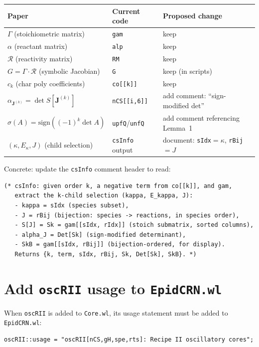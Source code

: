 \documentclass[11pt]{article}
\begin{document}
\begin{center}
\begin{tabular}{lll}
\textbf{Paper} & \textbf{Current code} & \textbf{Proposed change} \\
\hline
$\Gamma$ (stoichiometric matrix) & \texttt{gam} & keep \\
$\alpha$ (reactant matrix) & \texttt{alp} & keep \\
$\mathcal{R}$ (reactivity matrix) & \texttt{RM} & keep \\
$G = \Gamma \cdot \mathcal{R}$ (symbolic Jacobian) & \texttt{G} & keep (in scripts) \\
$c_k$ (char poly coefficients) & \texttt{co[[k]]} & keep \\
$\alpha_{\mathbf{J}^{(k)}} = \det S[\mathbf{J}^{(k)}]$ & \texttt{nCS[[i,6]]} & add comment: ``sign-modified det'' \\
$\sigma(A) = \mathrm{sign}((-1)^k \det A)$ & \texttt{upfQ}/\texttt{unfQ} & add comment referencing Lemma~1 \\
$(\kappa, E_\kappa, J)$ (child selection) & \texttt{csInfo} output & document: \texttt{sIdx}$=\kappa$, \texttt{rBij}$=J$ \\
\end{tabular}
\end{center}

Concrete: update the \texttt{csInfo} comment header to read:
\begin{verbatim}
(* csInfo: given order k, a negative term from co[[k]], and gam,
   extract the k-child selection (kappa, E_kappa, J):
   - kappa = sIdx (species subset),
   - J = rBij (bijection: species -> reactions, in species order),
   - S[J] = Sk = gam[[sIdx, rIdx]] (stoich submatrix, sorted columns),
   - alpha_J = Det[Sk] (sign-modified determinant),
   - SkB = gam[[sIdx, rBij]] (bijection-ordered, for display).
   Returns {k, term, sIdx, rBij, Sk, Det[Sk], SkB}. *)
\end{verbatim}


\section{Add \texttt{oscRII} usage to \texttt{EpidCRN.wl}}

When \texttt{oscRII} is added to \texttt{Core.wl}, its usage statement
must be added to \texttt{EpidCRN.wl}:
\begin{verbatim}
oscRII::usage = "oscRII[nCS,gH,spe,rts]: Recipe II oscillatory cores";
\end{verbatim}
\end{document}
